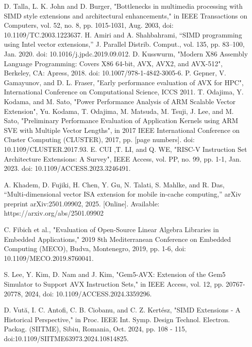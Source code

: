 \documentclass[conference]{IEEEtran}
\begin{document}
\begin{thebibliography}{00}
 D. Talla, L. K. John and D. Burger, "Bottlenecks in multimedia processing with SIMD style extensions and architectural enhancements," in IEEE Transactions on Computers, vol. 52, no. 8, pp. 1015-1031, Aug. 2003, doi: 10.1109/TC.2003.1223637.
 H. Amiri and A. Shahbahrami, “SIMD programming using Intel vector extensions,” J. Parallel Distrib. Comput., vol. 135, pp. 83–100, Jan. 2020. doi: 10.1016/j.jpdc.2019.09.012.
 D. Kusswurm, "Modern X86 Assembly Language Programming: Covers X86 64-bit, AVX, AVX2, and AVX-512", Berkeley, CA: Apress, 2018. doi: 10.1007/978-1-4842-3005-6.
 P. Gepner, V. Gamayunov, and D. L. Fraser, "Early performance evaluation of AVX for HPC", International Conference on Computational Science, ICCS 2011.
 T. Odajima, Y. Kodama, and M. Sato, "Power Performance Analysis of ARM Scalable Vector Extension", 
 Yu. Kodama, T. Odajima, M. Matsuda, M. Tsuji, J. Lee, and M. Sato, "Preliminary Performance Evaluation of Application Kernels using ARM SVE with Multiple Vector Lengths", in 2017 IEEE International Conference on Cluster Computing (CLUSTER), 2017, pp. [page numbers]. doi: 10.1109/CLUSTER.2017.93.
 E. CUI ,T. LI, and Q. WE, "RISC-V Instruction Set Architecture Extensions: A Survey",  IEEE Access, vol. PP, no. 99, pp. 1-1, Jan. 2023. doi: 10.1109/ACCESS.2023.3246491.


 A. Khadem, D. Fujiki, H. Chen, Y. Gu, N. Talati, S. Mahlke, and R. Das, “Multi-dimensional vector ISA extension for mobile in-cache computing,” arXiv preprint arXiv:2501.09902, 2025. [Online]. Available: https://arxiv.org/abs/2501.09902

 C. Fibich et al., "Evaluation of Open-Source Linear Algebra Libraries in Embedded Applications," 2019 8th Mediterranean Conference on Embedded Computing (MECO), Budva, Montenegro, 2019, pp. 1-6, doi: 10.1109/MECO.2019.8760041.

 S. Lee, Y. Kim, D. Nam and J. Kim, "Gem5-AVX: Extension of the Gem5 Simulator to Support AVX Instruction Sets," in IEEE Access, vol. 12, pp. 20767-20778, 2024, doi: 10.1109/ACCESS.2024.3359296.

 	D. Vută, I. C. Antofi, C. B. Ciobanu, and C. Z. Kertész, "SIMD Extensions - A Historical Perspective," in Proc. IEEE Int. Symp. Design Technol. Electron. Packag. (SIITME), Sibiu, Romania, Oct. 2024, pp. 108 - 115, doi:10.1109/SIITME63973.2024.10814825. 


\end{thebibliography}
\end{document}
